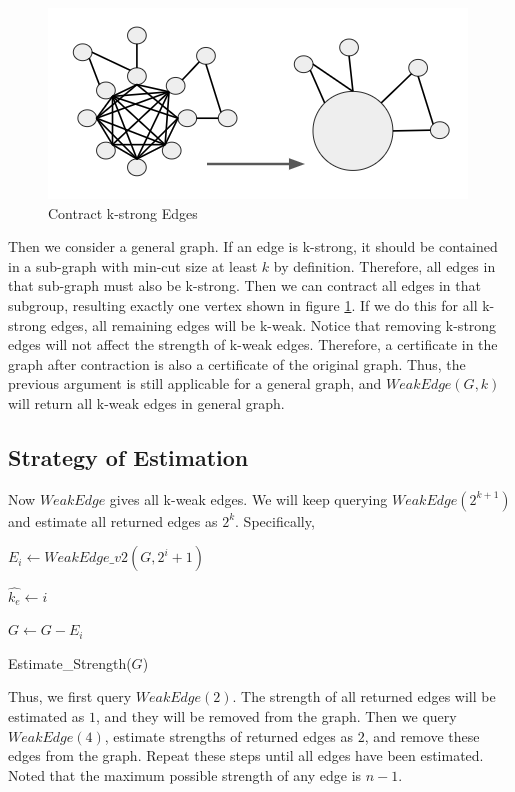\documentclass{article}
\begin{document}
\begin{figure}[h!]
\centering
\includegraphics[scale=0.4]{images/contract_strong.png}
\caption{Contract k-strong Edges}
\label{fig:contract_strong}
\end{figure}

Then we consider a general graph. If an edge is k-strong, it should be contained in a sub-graph with min-cut size at least $k$ by definition. Therefore, all edges in that sub-graph must also be k-strong. Then we can contract all edges in that subgroup, resulting exactly one vertex shown in figure \ref{fig:contract_strong}.
If we do this for all k-strong edges, all remaining edges will be k-weak. Notice that removing k-strong edges will not affect the strength of k-weak edges. Therefore, a certificate in the graph after contraction is also a certificate of the original graph. Thus, the previous argument is still applicable for a general graph, and $Weak Edge(G, k)$ will return all k-weak edges in general graph.

\subsection{Strategy of Estimation}

Now $Weak Edge$ gives all k-weak edges. We will keep querying $Weak Edge(2^{k+1})$ and estimate all returned edges as $2^k$. Specifically, 
\begin{algorithm}[H]
\SetAlgoLined

     {
        $E_i \gets WeakEdge\_v2(G, 2^i+1)$\;
        
         {
            $\hat{k_e} \gets i$\;
        }
    
        $G \gets G - E_i$\;
    }
        
\caption{Estimate\_Strength($G$)}
\end{algorithm}

Thus, we first query $WeakEdge(2)$. The strength of all returned edges will be estimated as $1$, and they will be removed from the graph. Then we query $WeakEdge(4)$, estimate strengths of returned edges as $2$, and remove these edges from the graph. Repeat these steps until all edges have been estimated. Noted that the maximum possible strength of any edge is $n-1$.  
\end{document}
